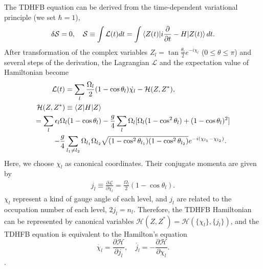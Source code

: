 \documentclass[%
superscriptaddress,
showpacs,
nofootinbib,
amsmath,amssymb,
aps,
prc,
twocolumn,
floatfix ]%
{revtex4-1}
\begin{document}
The TDHFB equation can be derived from the time-dependent variational
principle (we set $\hbar=1$),
\begin{equation}
	\delta \mathcal{S} = 0,
	\quad
	\mathcal{S}\equiv \int \mathcal{L}(t) dt =
	\int \braket{Z(t)|i\frac{\partial}{\partial t}-H|Z(t)}dt.
  \label{TDHFB}
\end{equation}
After transformation of the complex variables $Z_l = \tan{\frac{\theta_l}{2}}e^{-i\chi_l}$  ($0\leq\theta\leq\pi$) and several steps of the derivation, the Lagrangian $\mathcal{L}$ and the expectation value of Hamiltonian become
\begin{align}
\mathcal{L}(t) = \sum_l \frac{\Omega_l}{2}
	(1&-\cos{\theta}_l)\dot{\chi_l} - \mathcal{H}(Z,Z^*) ,\\
	\mathcal{H}(Z,Z^*) \equiv \braket{Z|H|Z}& \nonumber \\
  = \sum_l \epsilon_l\Omega_l(1- \cos{\theta}_l)& - \frac{g}{4}\sum_l \Omega_l [\Omega_l(1-\cos^2{\theta}_l)+(1-\cos{\theta}_l)^2] \nonumber \\
- \frac{g}{4}\sum_{l_1\neq l_2} \Omega_{l_1}\Omega_{l_2}&\sqrt{(1-\cos^2{\theta}_{l_1})(1-\cos^2{\theta}_{l_2})}e^{-i(\chi_{l_1}-\chi_{l_2})}   .
\label{TDHFB_Hamiltonian_2}
\end{align}
Here, we choose $\chi_l$ as canonical coordinates. Their conjugate momenta
are given by
\begin{align}
  j_l\equiv \frac{\partial\mathcal{L}}{\partial\dot{\chi}_l}=\frac{\Omega_l}{2}
	(1-\cos{\theta}_l) .
\end{align}
$\chi_l$ represent a kind of gauge angle of each level,
and $j_l$ are related to the occupation number of each level, $2j_l=n_l$. Therefore, the TDHFB Hamiltonian can be represented by canonical variables $\mathcal{H}(Z,Z^*) = \mathcal{H}(\{\chi_l\},\{j_l\})$, and the TDHFB equation is equivalent to the Hamilton's equation
\begin{equation}
	\dot{\chi_l} = \frac{\partial\mathcal{H}}{\partial j_l}, \quad
	\dot{j_l} = -\frac{\partial\mathcal{H}}{\partial \chi_l} .
\end{equation}
.
\end{document}
